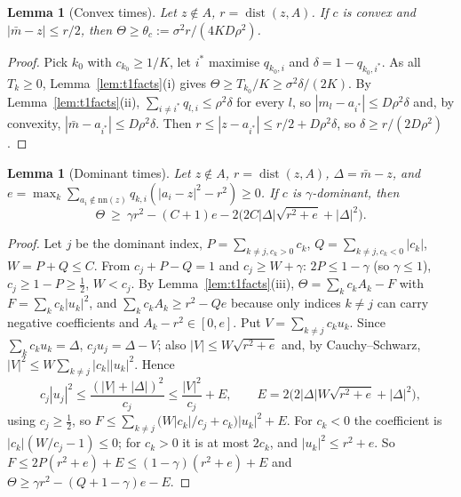 \documentclass[11pt]{article}
\newtheorem{lemma}[theorem]{Lemma}
\theoremstyle{definition}
\theoremstyle{remark}
\newcommand{\nn}{\mathrm{nn}}
\DeclareMathOperator{\dist}{dist}
\begin{document}
\begin{lemma}[Convex times]\label{lem:t1convex}
Let $z\notin A$, $r=\dist(z,A)$. If $c$ is convex and $|\bar m-z|\le r/2$, then
$\Theta\ge\theta_c:=\sigma^2r/(4KD\rho^2)$.
\end{lemma}
\begin{proof}
Pick $k_0$ with $c_{k_0}\ge1/K$, let $i^*$ maximise $q_{k_0,i}$ and $\delta=1-q_{k_0,i^*}$. As all
$T_k\ge0$, Lemma~\ref{lem:t1facts}(i) gives $\Theta\ge T_{k_0}/K\ge\sigma^2\delta/(2K)$. By
Lemma~\ref{lem:t1facts}(ii), $\sum_{i\ne i^*}q_{l,i}\le\rho^2\delta$ for every $l$, so
$|m_l-a_{i^*}|\le D\rho^2\delta$ and, by convexity, $|\bar m-a_{i^*}|\le D\rho^2\delta$. Then
$r\le|z-a_{i^*}|\le r/2+D\rho^2\delta$, so $\delta\ge r/(2D\rho^2)$.
\end{proof}

\begin{lemma}[Dominant times]\label{lem:t1dominant}
Let $z\notin A$, $r=\dist(z,A)$, $\Delta=\bar m-z$, and
$e=\max_k\sum_{a_i\notin\nn(z)}q_{k,i}(|a_i-z|^2-r^2)\ge0$. If $c$ is $\gamma$-dominant, then
\[
\Theta\ \ge\ \gamma r^2-(C+1)e-2\big(2C|\Delta|\sqrt{r^2+e}+|\Delta|^2\big).
\]
\end{lemma}
\begin{proof}
Let $j$ be the dominant index, $P=\sum_{k\ne j,c_k>0}c_k$, $Q=\sum_{k\ne j,c_k<0}|c_k|$, $W=P+Q\le C$.
From $c_j+P-Q=1$ and $c_j\ge W+\gamma$: $2P\le1-\gamma$ (so $\gamma\le1$), $c_j\ge1-P\ge\frac12$,
$W<c_j$. By
Lemma~\ref{lem:t1facts}(iii), $\Theta=\sum_kc_kA_k-F$ with $F=\sum_kc_k|u_k|^2$, and
$\sum_kc_kA_k\ge r^2-Qe$ because only indices $k\ne j$ can carry negative coefficients and
$A_k-r^2\in[0,e]$. Put $V=\sum_{k\ne j}c_ku_k$. Since $\sum_kc_ku_k=\Delta$, $c_ju_j=\Delta-V$; also
$|V|\le W\sqrt{r^2+e}$ and, by Cauchy--Schwarz, $|V|^2\le W\sum_{k\ne j}|c_k||u_k|^2$. Hence
\[
c_j|u_j|^2\le\frac{(|V|+|\Delta|)^2}{c_j}\le\frac{|V|^2}{c_j}+E,\qquad
E=2\big(2|\Delta|W\sqrt{r^2+e}+|\Delta|^2\big),
\]
using $c_j\ge\frac12$, so $F\le\sum_{k\ne j}\big(W|c_k|/c_j+c_k\big)|u_k|^2+E$. For $c_k<0$ the
coefficient is $|c_k|(W/c_j-1)\le0$; for $c_k>0$ it is at most $2c_k$, and $|u_k|^2\le r^2+e$. So
$F\le2P(r^2+e)+E\le(1-\gamma)(r^2+e)+E$ and $\Theta\ge\gamma r^2-(Q+1-\gamma)e-E$.
\end{proof}
\end{document}
